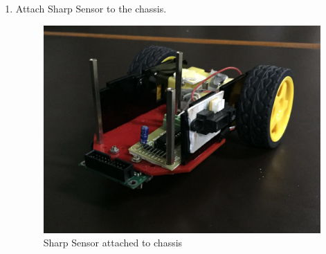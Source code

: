\documentclass[a4paper,12pt,oneside]{book}
\begin{document}
\begin{enumerate}
\item Attach Sharp Sensor to the chassis.
\begin{figure}[h]
        \centering
        \includegraphics[scale=0.16]{a_Sharp}
        \caption{Sharp Sensor attached to chassis}
      \end{figure}
      \newpage


\end{enumerate}
\end{document}
